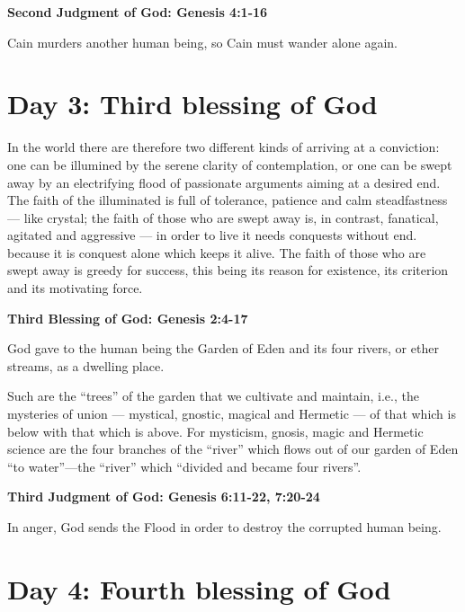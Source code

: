 \textbf{Second Judgment of God: Genesis 4:1-16}

Cain murders another human being, so Cain must wander alone again.

\section{Day 3: Third blessing of God}

\begin{quotex}
In the world there are therefore two different kinds of arriving at a conviction: one can be illumined by the serene clarity of contemplation, or one can be swept away by an electrifying flood of passionate arguments aiming at a desired end. The faith of the illuminated is full of tolerance, patience and calm steadfastness — like crystal; the faith of those who are swept away is, in contrast, fanatical, agitated and aggressive — in order to live it needs conquests without end. because it is conquest alone which keeps it alive. The faith of those who are swept away is greedy for success, this being its reason for existence, its criterion and its motivating force. 

\end{quotex}

\textbf{Third Blessing of God: Genesis 2:4-17}

God gave to the human being the Garden of Eden and its four rivers, or ether streams, as a dwelling place.

\begin{quotex}
Such are the ``trees'' of the garden that we cultivate and maintain, i.e., the mysteries of union —
mystical, gnostic, magical and Hermetic — of that which is below with that which is above. For
mysticism, gnosis, magic and Hermetic science are the four branches of the ``river'' which flows out of our garden of Eden ``to water''—the ``river'' which ``divided and became four rivers''. 

\end{quotex}

\textbf{Third Judgment of God: Genesis 6:11-22, 7:20-24}

In anger, God sends the Flood in order to destroy the corrupted human being.

\section{Day 4: Fourth blessing of God}

